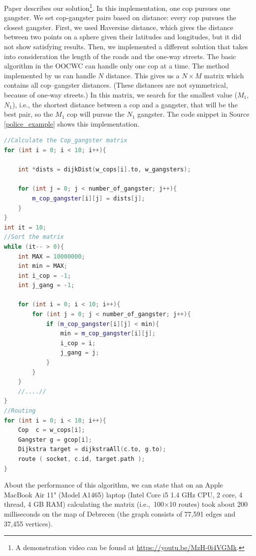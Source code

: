 \documentclass[b5paper,12pt]{report}
\theoremstyle{definition}
\begin{document}
Paper \cite{forkcoginfocom} describes our solution\footnote{A demonstration video can be found at \url{https://youtu.be/MzH-0i4VGMk}.}. In this implementation, one cop pursues one gangster. We set cop-gangster pairs based on distance: every cop pursues the closest gangster. First, we used Haversine distance, which gives the distance between two points on a sphere given their latitudes and longitudes, but it did not show satisfying results. Then, we implemented a different solution that takes into consideration the length of the roads and the one-way streets. The basic algorithm in the OOCWC can handle only one cop at a time. The method implemented by us can handle $N$ distance. This gives us a $N\times M$ matrix which contains all cop--gangster distances. (These distances are not symmetrical, because of one-way streets.) In this matrix, we search for the smallest value ($M_1$, $N_1$), i.e., the shortest distance between a cop and a gangster, that will be the best pair, so the $M_1$ cop will pursue the $N_1$ gangster. The code snippet in Source \ref{police_example} shows this implementation.

\begin{lstlisting}[language=C++,caption=Code snippet of the algorithm created for the Police Edition., label=police_example]
//Calculate the Cop_gangster matrix
for (int i = 0; i < 10; i++){
    
    int *dists = dijkDist(w_cops[i].to, w_gangsters);
    
    for (int j = 0; j < number_of_gangster; j++){
        m_cop_gangster[i][j] = dists[j];
    }
}
int it = 10;
//Sort the matrix
while (it-- > 0){
    int MAX = 10000000;
    int min = MAX;
    int i_cop = -1;
    int j_gang = -1;
    
    for (int i = 0; i < 10; i++){
        for (int j = 0; j < number_of_gangster; j++){
            if (m_cop_gangster[i][j] < min){
                min = m_cop_gangster[i][j];
                i_cop = i;
                j_gang = j;
            }
        }
    }
    //....//
}
//Routing
for (int i = 0; i < 10; i++){
    Cop  c = w_cops[i];
    Gangster g = gcop[i];
    Dijkstra target = dijkstraAll(c.to, g.to);
    route ( socket, c.id, target.path );
}
\end{lstlisting}

About the performance of this algorithm, we can state that on an Apple MacBook Air 11" (Model A1465) laptop (Intel Core i5 1.4 GHz CPU, 2 core, 4 thread, 4 GB RAM) calculating the matrix (i.e.,~100$\times$10 routes) took about 200 milliseconds on the map of Debrecen (the graph consists of 77,591 edges and 37,455 vertices).
\end{document}
